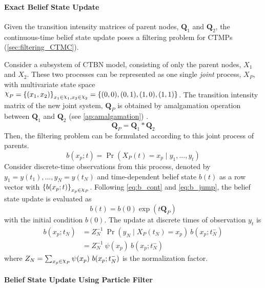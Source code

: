 \paragraph*{Exact Belief State Update}
Given the transition intensity matrices of parent nodes, $ \textbf{Q}_1 $ and $ \textbf{Q}_2 $, the continuous-time belief state update poses a filtering problem for CTMPs (\cref{sec:filtering_CTMC}). 

Consider a subsystem of CTBN model, consisting of only the parent nodes, $ X_1 $ and $ X_2 $. These two processes can be represented as one single \textit{joint} process, $ X_P $, with multivariate state space $ \rchi_{P} = \left\lbrace (x_1, x_2)\right\rbrace_{x_1\in \rchi_1, x_2 \in \rchi_2}  = \left\lbrace (0,0), (0,1), (1,0), (1,1)\right\rbrace  $. The transition intensity matrix of the new joint system, $ \textbf{Q}_P $ is obtained by amalgamation operation between $ \textbf{Q}_{1} $ and  $ \textbf{Q}_{2} $ (see \cref{ap:amalgamation}) \cite{Nodelman1995}.
\begin{equation}
\textbf{Q}_P = \textbf{Q}_{1} * \textbf{Q}_{2}
\end{equation}
Then, the filtering problem can be formulated according to this joint process of parents.
\begin{equation}
b(x_p; t) = \operatorname{Pr}( X_P(t) = x_{p} \mid y_{1}, ..., y_{t})
\end{equation}
Consider discrete-time observations from this process, denoted by $ y_{1}=y(t_{1}), ..., y_{N}=y(t_{N}) $ and time-dependent belief state $ b(t) $ as a row vector with $ \left\lbrace b(x_p;t)\right\rbrace_{x_p \in \rchi_P} $. Following \autoref{eq:b_cont} and \autoref{eq:b_jump}, the belief state update is evaluated as
\begin{equation}
b(t) = b(0) \exp(t\textbf{Q}_P)
\end{equation}
with the initial condition $ b(0) $.
The update at discrete times of observation $ y_{t} $ is
\begin{align}
b(x_p; t_{N}) &= Z_{N}^{-1}\ {\operatorname{Pr}(y_{N} \mid X_P(t_{N})=x_p)}\ {b(x_p; t_{N}^{-})} \\ & = Z_{N}^{-1}\ \psi(x_p) \ {b(x_p; t_{N}^{-})}
\end{align}
where $ Z_{N} = \sum_{x_p\in \rchi_P} \psi(x_p)\ b(x_p; t_{N}^{-}) $ is the normalization factor.

\paragraph*{Belief State Update Using Particle Filter}

